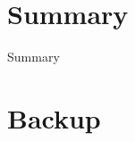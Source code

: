 \documentclass[8pt,t]{beamer}
\begin{document}
\section{Summary}

\begin{frame}{Summary}
\end{frame}


\appendix
\section{Backup}


\end{document}
